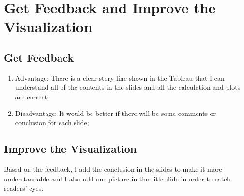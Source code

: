\documentclass[10pt, a4paper, twocolumn]{article} %
\begin{document}
\section{Get Feedback and Improve the Visualization }
\subsection{Get Feedback }
\begin{enumerate}
	\item Advantage: There is a clear story line shown in the Tableau that I can understand all of the contents in the slides and all the calculation and plots are correct;
         \item Disadvantage: It would be better if there will be some comments or conclusion for each slide;  
	\end{enumerate}
\subsection{Improve the Visualization}


Based on the feedback, I add the conclusion in the slides to make it more understandable and I also add one picture in the title slide in order to catch readers' eyes.



\end{document}
